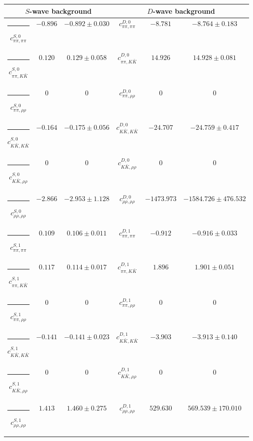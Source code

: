 \begin{table}[h]
\begin{ruledtabular}
\begin{tabular}{c c c c c c c c c}
\end{tabular}
\vspace{2em}
\begin{tabular}{c c c c c c}
\multicolumn{3}{c}{$S$-wave background}  & \multicolumn{3}{c}{$D$-wave background} \\ \hline
\rule[-0.2cm]{-0.1cm}{.55cm} $c^{S,0}_{\pi\pi,\pi\pi}$ &$-0.896$ & $-0.892 \pm 0.030$ & $c^{D,0}_{\pi\pi,\pi\pi}$ &$-8.781$ & $-8.764 \pm 0.183$ \\
\rule[-0.2cm]{-0.1cm}{.55cm} $c^{S,0}_{\pi\pi,K\bar K}$ &$0.120$ & $0.129 \pm 0.058$ & $c^{D,0}_{\pi\pi,K\bar K}$ &$14.926$ & $14.928 \pm 0.081$ \\
\rule[-0.2cm]{-0.1cm}{.55cm} $c^{S,0}_{\pi\pi,\rho\rho}$ &$0$ & $0$ & $c^{D,0}_{\pi\pi,\rho\rho}$ &$0$ & $0$ \\
\rule[-0.2cm]{-0.1cm}{.55cm} $c^{S,0}_{K\bar K,K\bar K}$ &$-0.164$ & $-0.175 \pm 0.056$ & $c^{D,0}_{K\bar K,K\bar K}$ &$-24.707$ & $-24.759 \pm 0.417$ \\
\rule[-0.2cm]{-0.1cm}{.55cm} $c^{S,0}_{K\bar K,\rho\rho}$ &$0$ & $0$ & $c^{D,0}_{K\bar K,\rho\rho}$ &$0$ & $0$ \\
\rule[-0.2cm]{-0.1cm}{.55cm} $c^{S,0}_{\rho\rho,\rho\rho}$ &$-2.866$ & $-2.953 \pm 1.128$ & $c^{D,0}_{\rho\rho,\rho\rho}$ &$-1473.973$ & $-1584.726 \pm 476.532$ \\
\rule[-0.2cm]{-0.1cm}{.55cm} $c^{S,1}_{\pi\pi,\pi\pi}$ &$0.109$ & $0.106 \pm 0.011$ & $c^{D,1}_{\pi\pi,\pi\pi}$ &$-0.912$ & $-0.916 \pm 0.033$ \\
\rule[-0.2cm]{-0.1cm}{.55cm} $c^{S,1}_{\pi\pi,K\bar K}$ &$0.117$ & $0.114 \pm 0.017$ & $c^{D,1}_{\pi\pi,K\bar K}$ &$1.896$ & $1.901 \pm 0.051$ \\
\rule[-0.2cm]{-0.1cm}{.55cm} $c^{S,1}_{\pi\pi,\rho\rho}$ &$0$ & $0$ & $c^{D,1}_{\pi\pi,\rho\rho}$ &$0$ & $0$ \\
\rule[-0.2cm]{-0.1cm}{.55cm} $c^{S,1}_{K\bar K,K\bar K}$ &$-0.141$ & $-0.141 \pm 0.023$ & $c^{D,1}_{K\bar K,K\bar K}$ &$-3.903$ & $-3.913 \pm 0.140$ \\
\rule[-0.2cm]{-0.1cm}{.55cm} $c^{S,1}_{K\bar K,\rho\rho}$ &$0$ & $0$ & $c^{D,1}_{K\bar K,\rho\rho}$ &$0$ & $0$ \\
\rule[-0.2cm]{-0.1cm}{.55cm} $c^{S,1}_{\rho\rho,\rho\rho}$ &$1.413$ & $1.460 \pm 0.275$ & $c^{D,1}_{\rho\rho,\rho\rho}$ &$529.630$ & $569.539 \pm 170.010$ \\
\end{tabular}
\end{ruledtabular}
\end{table}
